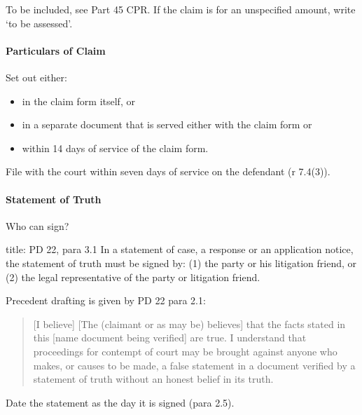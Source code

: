 \documentclass[
]{article}
\newenvironment{Shaded}{}{}
\newcommand{\NormalTok}[1]{#1}
\providecommand{\tightlist}{%
  \setlength{\itemsep}{0pt}\setlength{\parskip}{0pt}}
\begin{document}
To be included, see Part 45 CPR. If the claim is for an unspecified
amount, write `to be assessed'.

\hypertarget{particulars-of-claim}{%
\paragraph{Particulars of Claim}\label{particulars-of-claim}}

Set out either:

\begin{itemize}
\tightlist
\item
  in the claim form itself, or
\item
  in a separate document that is served either with the claim form or
\item
  within 14 days of service of the claim form.
\end{itemize}

File with the court within seven days of service on the defendant (r
7.4(3)).

\hypertarget{statement-of-truth}{%
\paragraph{Statement of Truth}\label{statement-of-truth}}

Who can sign?

\begin{Shaded}
\begin{Highlighting}[]
\NormalTok{title: PD 22, para 3.1}
\NormalTok{In a statement of case, a response or an application notice, the statement of truth must be signed by:}
\NormalTok{(1) the party or his litigation friend, or}
\NormalTok{(2) the legal representative of the party or litigation friend.}
\end{Highlighting}
\end{Shaded}

Precedent drafting is given by PD 22 para 2.1:

\begin{quote}
{[}I believe{]} {[}The (claimant or as may be) believes{]} that the
facts stated in this {[}name document being verified{]} are true. I
understand that proceedings for contempt of court may be brought against
anyone who makes, or causes to be made, a false statement in a document
verified by a statement of truth without an honest belief in its truth.
\end{quote}

Date the statement as the day it is signed (para 2.5).
\end{document}
